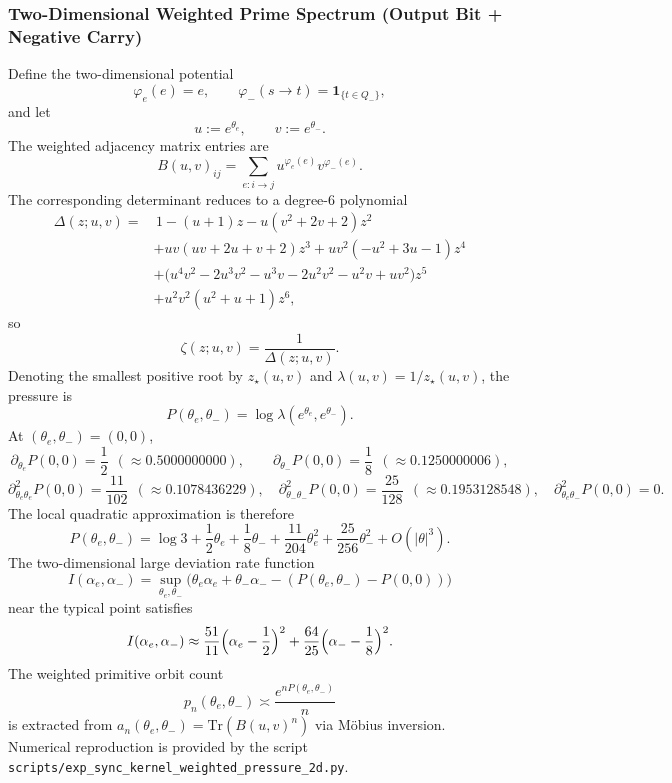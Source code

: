 \subsubsection{Two-Dimensional Weighted Prime Spectrum (Output Bit + Negative Carry)}
Define the two-dimensional potential
\[
\varphi_e(e)=e,\qquad \varphi_-(s\to t)=\mathbf{1}_{\{t\in Q_-\}},
\]
and let
\[
u:=e^{\theta_e},\qquad v:=e^{\theta_-}.
\]
The weighted adjacency matrix entries are
\[
B(u,v)_{ij}=\sum_{e:i\to j}u^{\varphi_e(e)}v^{\varphi_-(e)}.
\]
The corresponding determinant reduces to a degree-6 polynomial
\[
\begin{aligned}
\Delta(z;u,v)=&\,1-(u+1)z-u(v^2+2v+2)z^2\\
&+uv(uv+2u+v+2)z^3+uv^2(-u^2+3u-1)z^4\\
&+\bigl(u^4v^2-2u^3v^2-u^3v-2u^2v^2-u^2v+uv^2\bigr)z^5\\
&+u^2v^2(u^2+u+1)z^6,
\end{aligned}
\]
so
\[
\zeta(z;u,v)=\frac{1}{\Delta(z;u,v)}.
\]
Denoting the smallest positive root by $z_\star(u,v)$ and $\lambda(u,v)=1/z_\star(u,v)$, the pressure is
\[
P(\theta_e,\theta_-)=\log\lambda(e^{\theta_e},e^{\theta_-}).
\]
At $(\theta_e,\theta_-)=(0,0)$,
\[
\partial_{\theta_e}P(0,0)=\frac12\ \ (\approx 0.5000000000),\qquad
\partial_{\theta_-}P(0,0)=\frac18\ \ (\approx 0.1250000006),
\]
\[
\partial^2_{\theta_e\theta_e}P(0,0)=\frac{11}{102}\ \ (\approx 0.1078436229),\quad
\partial^2_{\theta_-\theta_-}P(0,0)=\frac{25}{128}\ \ (\approx 0.1953128548),\quad
\partial^2_{\theta_e\theta_-}P(0,0)=0.
\]
The local quadratic approximation is therefore
\[
P(\theta_e,\theta_-)=\log 3+\frac12\theta_e+\frac18\theta_-+\frac{11}{204}\theta_e^2+\frac{25}{256}\theta_-^2+O(|\theta|^3).
\]
The two-dimensional large deviation rate function
\[
I(\alpha_e,\alpha_-)=\sup_{\theta_e,\theta_-}\bigl(\theta_e\alpha_e+\theta_-\alpha_- - (P(\theta_e,\theta_-)-P(0,0))\bigr)
\]
near the typical point satisfies
\[
I(\alpha_e,\alpha_-)\approx \frac{51}{11}\Bigl(\alpha_e-\frac12\Bigr)^2+\frac{64}{25}\Bigl(\alpha_- -\frac18\Bigr)^2.
\]
The weighted primitive orbit count
\[
p_n(\theta_e,\theta_-)\asymp \frac{e^{nP(\theta_e,\theta_-)}}{n}
\]
is extracted from $a_n(\theta_e,\theta_-)=\mathrm{Tr}(B(u,v)^n)$ via M\"obius inversion. Numerical reproduction is provided by the script \texttt{scripts/exp\_sync\_kernel\_weighted\_pressure\_2d.py}.

